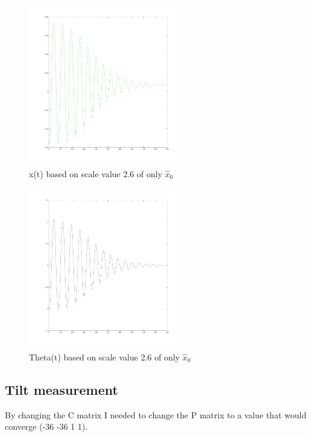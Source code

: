 \documentclass{article}
\begin{document}
\begin{figure}[H]
    \centering
    \includegraphics[width=0.6\textwidth]{x_pos_segway_obs_inital_only.jpg}
    \caption{x(t) based on scale value 2.6 of only $\hat{x}_0$}
    \label{fig:x_segway}
\end{figure}

\begin{figure}[H]
    \centering
    \includegraphics[width=0.6\textwidth]{th_pos_segway_obs_inital_only.jpg}
    \caption{Theta(t) based on scale value 2.6 of only $\hat{x}_0$}
    \label{fig:th_segway}
\end{figure}

\subsection{Tilt measurement}
By changing the C matrix I needed to change the P matrix to a value that would converge (-36 -36 1 1).
\end{document}
